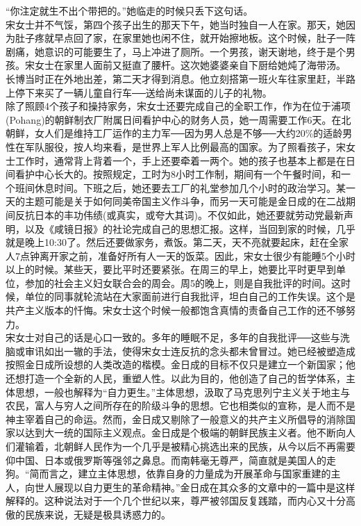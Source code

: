 “你注定就生不出个带把的。”她临走的时候只丢下这句话。\\

宋女士并不气馁，第四个孩子出生的那天下午，她当时独自一人在家。那天，她因为肚子疼就早点回了家，在家里她也闲不住，就开始擦地板。这个时候，肚子一阵剧痛，她意识的可能要生了，马上冲进了厕所。一个男孩，谢天谢地，终于是个男孩。宋女士在家里人面前又挺直了腰杆。这次她婆婆亲自下厨给她炖了海带汤。\\

长博当时正在外地出差，第二天才得到消息。他立刻搭第一班火车往家里赶，半路上停下来买了一辆儿童自行车──送给尚未谋面的儿子的礼物。\\

除了照顾4个孩子和操持家务，宋女士还要完成自己的全职工作，作为在位于浦项(Pohang)的朝鲜制衣厂附属日间看护中心的财务人员，她一周需要工作6天。在北朝鲜，女人们是维持工厂运作的主力军──因为男人总是不够──大约20\%的适龄男性在军队服役，按人均来看，是世界上军人比例最高的国家。为了照看孩子，宋女士工作时，通常背上背着一个，手上还要牵着一两个。她的孩子也基本上都是在日间看护中心长大的。按照规定，工时为8小时工作制，期间有一个午餐时间，和一个班间休息时间。下班之后，她还要去工厂的礼堂参加几个小时的政治学习。某一天的主题可能是关于如何同美帝国主义作斗争，而另一天可能是金日成的在二战期间反抗日本的丰功伟绩(或真实，或夸大其词)。不仅如此，她还要就劳动党最新声明，以及《咸镜日报》的社论完成自己的思想汇报。这样，当回到家的时候，几乎就是晚上10:30了。然后还要做家务，煮饭。第二天，天不亮就要起床，赶在全家人7点钟离开家之前，准备好所有人一天的饭菜。因此，宋女士很少有能睡5个小时以上的时候。某些天，要比平时还要紧张。在周三的早上，她要比平时更早到单位，参加的社会主义妇女联合会的周会。周5的晚上，则是自我批评的时间。这时候，单位的同事就轮流站在大家面前进行自我批评，坦白自己的工作失误。这个是共产主义版本的忏悔。宋女士这个时候一般都饱含真情的责备自己工作的还不够努力。\\

宋女士对自己的话是心口一致的。多年的睡眠不足，多年的自我批评──这些与洗脑或审讯如出一辙的手法，使得宋女士连反抗的念头都未曾冒过。她已经被塑造成按照金日成所设想的人类改造的楷模。金日成的目标不仅只是建立一个新国家；他还想打造一个全新的人民，重塑人性。以此为目的，他创造了自己的哲学体系，主体思想，一般也解释为“自力更生。”主体思想，汲取了马克思列宁主义关于地主与农民，富人与穷人之间所存在的阶级斗争的思想。它也相类似的宣称，是人而不是神主宰着自己的命运。然而，金日成又剔除了一般意义的共产主义所倡导的消除国家以达到大一统的国际主义观点。金日成是个极端的朝鲜民族主义者。他不断向人们灌输着，北朝鲜人民作为一个几乎是被精心挑选出来的民族，从今以后不再需要仰中国、日本或俄罗斯等强邻之鼻息。而南韩毫无尊严，简直就是美国人的走狗。“简而言之，建立主体思想，依靠自身的力量成为开展革命与国家重建的主人，向世人展现以自力更生的革命精神。”金日成在其众多的文章中的一篇中是这样解释的。这种说法对于一个几个世纪以来，尊严被邻国反复践踏，而内心又十分高傲的民族来说，无疑是极具诱惑力的。\\

